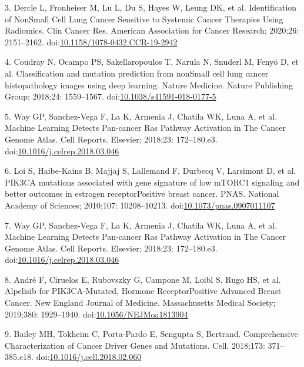 \documentclass[10pt,letterpaper]{article}
\begin{document}
\leavevmode\hypertarget{ref-dercleIdentificationNonSmall2020}{}%
3. Dercle L, Fronheiser M, Lu L, Du S, Hayes W, Leung DK, et al.
Identification of NonSmall Cell Lung Cancer Sensitive to Systemic Cancer
Therapies Using Radiomics. Clin Cancer Res. American Association for
Cancer Research; 2020;26: 2151--2162.
doi:\href{https://doi.org/10.1158/1078-0432.CCR-19-2942}{10.1158/1078-0432.CCR-19-2942}

\leavevmode\hypertarget{ref-coudrayClassificationMutationPrediction2018}{}%
4. Coudray N, Ocampo PS, Sakellaropoulos T, Narula N, Snuderl M, Fenyö
D, et al. Classification and mutation prediction from nonSmall cell lung
cancer histopathology images using deep learning. Nature Medicine.
Nature Publishing Group; 2018;24: 1559--1567.
doi:\href{https://doi.org/10.1038/s41591-018-0177-5}{10.1038/s41591-018-0177-5}

\leavevmode\hypertarget{ref-wayMachineLearningDetects2018}{}%
5. Way GP, Sanchez-Vega F, La K, Armenia J, Chatila WK, Luna A, et al.
Machine Learning Detects Pan-cancer Ras Pathway Activation in The Cancer
Genome Atlas. Cell Reports. Elsevier; 2018;23: 172--180.e3.
doi:\href{https://doi.org/10.1016/j.celrep.2018.03.046}{10.1016/j.celrep.2018.03.046}

\leavevmode\hypertarget{ref-loiPIK3CAMutationsAssociated2010}{}%
6. Loi S, Haibe-Kains B, Majjaj S, Lallemand F, Durbecq V, Larsimont D,
et al. PIK3CA mutations associated with gene signature of low mTORC1
signaling and better outcomes in estrogen receptorPositive breast
cancer. PNAS. National Academy of Sciences; 2010;107: 10208--10213.
doi:\href{https://doi.org/10.1073/pnas.0907011107}{10.1073/pnas.0907011107}

\leavevmode\hypertarget{ref-way_2018_machine_cellreports}{}%
7. Way GP, Sanchez-Vega F, La K, Armenia J, Chatila WK, Luna A, et al.
Machine Learning Detects Pan-cancer Ras Pathway Activation in The Cancer
Genome Atlas. Cell Reports. Elsevier; 2018;23: 172--180.e3.
doi:\href{https://doi.org/10.1016/j.celrep.2018.03.046}{10.1016/j.celrep.2018.03.046}

\leavevmode\hypertarget{ref-andre_2019_alpelisib_nengljmeda}{}%
8. André F, Ciruelos E, Rubovszky G, Campone M, Loibl S, Rugo HS, et al.
Alpelisib for PIK3CA-Mutated, Hormone ReceptorPositive Advanced Breast
Cancer. New England Journal of Medicine. Massachusetts Medical Society;
2019;380: 1929--1940.
doi:\href{https://doi.org/10.1056/NEJMoa1813904}{10.1056/NEJMoa1813904}

\leavevmode\hypertarget{ref-baileyComprehensiveCharacterizationCancer2018}{}%
9. Bailey MH, Tokheim C, Porta-Pardo E, Sengupta S, Bertrand.
Comprehensive Characterization of Cancer Driver Genes and Mutations.
Cell. 2018;173: 371--385.e18.
doi:\href{https://doi.org/10.1016/j.cell.2018.02.060}{10.1016/j.cell.2018.02.060}
\end{document}
